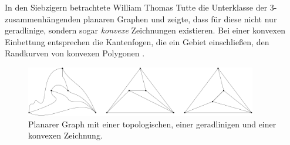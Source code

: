 In den Siebzigern betrachtete William Thomas Tutte die Unterklasse der 3-zusammenhängenden planaren Graphen und zeigte, dass für diese nicht nur geradlinige, sondern sogar \textit{konvexe} Zeichnungen existieren. Bei einer konvexen Einbettung entsprechen die Kantenfogen, die ein Gebiet einschließen, den Randkurven von konvexen Polygonen \cite{tutte63}.

\begin{figure}
	\centering
  \includegraphics[width=0.9\textwidth]{topo_straight_convex.png}
	\caption{Planarer Graph mit einer topologischen, einer geradlinigen und einer konvexen Zeichnung.}
	\label{topo_straight_convex}
\end{figure}





